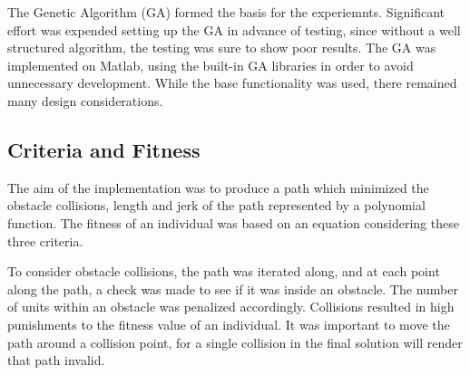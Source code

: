 	
		
			
		

The Genetic Algorithm (GA) formed the basis for the experiemnts. Significant effort was expended setting up the GA in advance of testing, since without a well structured algorithm, the testing was sure to show poor results. The GA was implemented on Matlab, using the built-in GA libraries in order to avoid unnecessary development. While the base functionality was used, there remained many design considerations.

\subsection{Criteria and Fitness}
The aim of the implementation was to produce a path which minimized the obstacle collisions, length and jerk of the path represented by a polynomial function. The fitness of an individual was based on an equation considering these three criteria.

To consider obstacle collisions, the path was iterated along, and at each point along the path, a check was made to see if it was inside an obstacle. The number of units within an obstacle was penalized accordingly. Collisions resulted in high punishments to the fitness value of an individual. It was important to move the path around a collision point, for a single collision in the final solution will render that path invalid.

